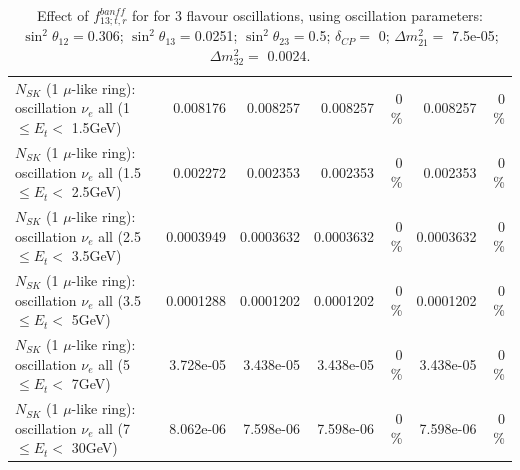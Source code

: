 \begin{table}
\begin{tabular}{| l | r | r | r  r | r  r |}
$N_{SK}$ (1 $\mu$-like ring): oscillation $\nu_{e}$ all (1 $\leq E_{t} <$ 1.5GeV) &        0.008176 &        0.008257 &        0.008257 &        0 \%  &        0.008257 &        0 \%  \\ 
$N_{SK}$ (1 $\mu$-like ring): oscillation $\nu_{e}$ all (1.5 $\leq E_{t} <$ 2.5GeV) &        0.002272 &        0.002353 &        0.002353 &        0 \%  &        0.002353 &        0 \%  \\ 
$N_{SK}$ (1 $\mu$-like ring): oscillation $\nu_{e}$ all (2.5 $\leq E_{t} <$ 3.5GeV) &       0.0003949 &       0.0003632 &       0.0003632 &        0 \%  &       0.0003632 &        0 \%  \\ 
$N_{SK}$ (1 $\mu$-like ring): oscillation $\nu_{e}$ all (3.5 $\leq E_{t} <$ 5GeV) &       0.0001288 &       0.0001202 &       0.0001202 &        0 \%  &       0.0001202 &        0 \%  \\ 
 $N_{SK}$ (1 $\mu$-like ring): oscillation $\nu_{e}$ all (5 $\leq E_{t} <$ 7GeV) &       3.728e-05 &       3.438e-05 &       3.438e-05 &        0 \%  &       3.438e-05 &        0 \%  \\ 
$N_{SK}$ (1 $\mu$-like ring): oscillation $\nu_{e}$ all (7 $\leq E_{t} <$ 30GeV) &       8.062e-06 &       7.598e-06 &       7.598e-06 &        0 \%  &       7.598e-06 &        0 \%  \\ 
\hline
\hline
\end{tabular}
\caption{ Effect of $f_{13; t, r}^{banff}$ for for 3 flavour oscillations, using oscillation parameters:  $\sin^2\theta_{12} = $0.306; $\sin^2\theta_{13} = $0.0251; $\sin^2\theta_{23} = $0.5; $\delta_{CP} = $        0; $\Delta m^2_{21} = $    7.5e-05; $\Delta m^2_{32} = $    0.0024. }
\label{tab:num_banff_13_1RmuT_3f_osc_t13:0.0251}
\end{table}
\clearpage
